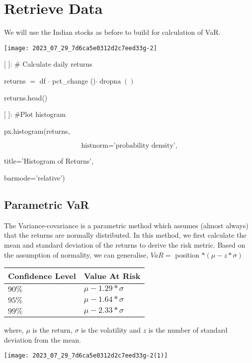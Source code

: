 \documentclass[10pt]{article}
\begin{document}
\section*{Retrieve Data}
We will use the Indian stocks as before to build for calculation of VaR.

\begin{center}
\texttt{[image: 2023\_07\_29\_7d6ca5e0312d2c7eed33g-2]}
\end{center}

[ ]: \# Calculate daily returns

returns $=$ df $\cdot$ pct\_change ()$\cdot \operatorname{dropna}()$

returns.head()

[ ]: \#Plot histogram

px.histogram(returns,

$$
\text { histnorm='probability density', }
$$

title='Histogram of Returns',

barmode='relative')

\subsection*{Parametric VaR}
The Variance-covariance is a parametric method which assumes (almost always) that the returns are normally distributed. In this method, we first calculate the mean and standard deviation of the returns to derive the risk metric. Based on the assumption of normality, we can generalise, $V a R=$ position $*(\mu-z * \sigma)$

\begin{center}
\begin{tabular}{ll}
\hline
Confidence Level & Value At Risk \\
\hline
$90 \%$ & $\mu-1.29 * \sigma$ \\
$95 \%$ & $\mu-1.64 * \sigma$ \\
$99 \%$ & $\mu-2.33 * \sigma$ \\
\hline
\end{tabular}
\end{center}

where, $\mu$ is the return, $\sigma$ is the volatility and $z$ is the number of standard deviation from the mean.

\begin{center}
\texttt{[image: 2023\_07\_29\_7d6ca5e0312d2c7eed33g-2(1)]}
\end{center}
\end{document}
